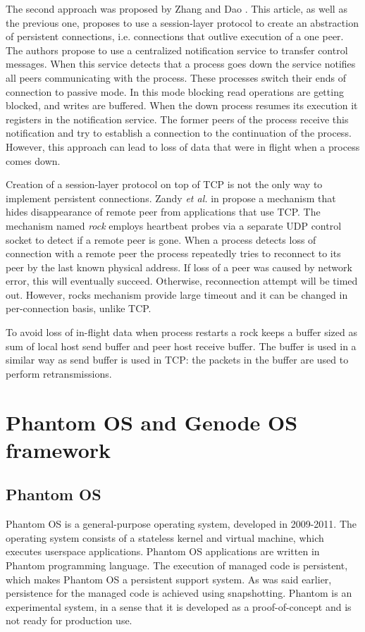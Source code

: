 The second approach was proposed by Zhang and Dao \cite{zhang1995persistent}.
This article, as well as the previous one, proposes to use a session-layer
protocol to create an abstraction of persistent connections, i.e. connections
that outlive execution of a one peer. The authors propose to use a centralized
notification service to transfer control messages. When this service detects
that a process goes down the service notifies all peers communicating with the
process. These processes switch their ends of connection to passive mode. In
this mode blocking read operations are getting blocked, and writes are buffered.
When the down process resumes its execution it registers in the notification
service. The former peers of the process receive this notification and try to
establish a connection to the continuation of the process. However, this
approach can lead to loss of data that were in flight when a process comes down.

Creation of a session-layer protocol on top of TCP is not the only way to
implement persistent connections. Zandy \textit{et al.} in \cite{rocks_racks}
propose a mechanism that hides disappearance of remote peer from applications
that use TCP. The mechanism named \textit{rock} employs heartbeat probes via a
separate UDP control socket to detect if a remote peer is gone. When a process
detects loss of connection with a remote peer the process repeatedly tries to
reconnect to its peer by the last known physical address. If loss of a peer was
caused by network error, this will eventually succeed. Otherwise, reconnection
attempt will be timed out. However, rocks mechanism provide large timeout and it
can be changed in per-connection basis, unlike TCP. 

To avoid loss of in-flight data when process restarts a rock keeps a buffer
sized as sum of local host send buffer and peer host receive buffer. The buffer
is used in a similar way as send buffer is used in TCP: the packets in the
buffer are used to perform retransmissions.

\section{Phantom OS and Genode OS framework}
\subsection{Phantom OS}

Phantom OS is a general-purpose operating system, developed in 2009-2011. The
operating system consists of a stateless kernel and virtual machine, which
executes userspace applications. Phantom OS applications are written in Phantom
programming language. The execution of managed code is persistent, which makes
Phantom OS a persistent support system. As was said earlier, persistence for the
managed code is achieved using snapshotting. Phantom is an experimental system,
in a sense that it is developed as a proof-of-concept and is not ready for
production use.

